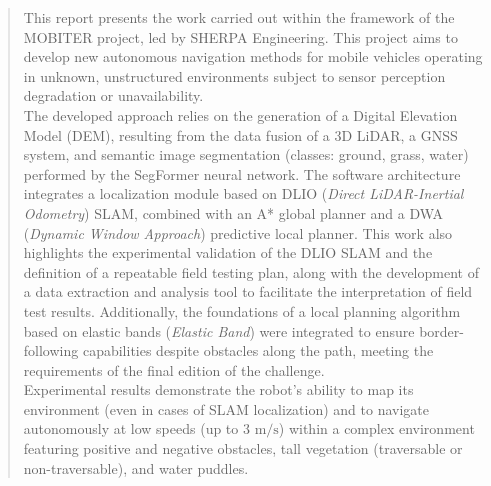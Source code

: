 \documentclass{CoursENSAM}
\begin{document}
\renewcommand{\abstractname}{Abstract}
\begin{abstract}
This report presents the work carried out within the framework of the MOBITER project, led by SHERPA Engineering. This project aims to develop new autonomous navigation methods for mobile vehicles operating in unknown, unstructured environments subject to sensor perception degradation or unavailability.\\
\indent The developed approach relies on the generation of a Digital Elevation Model (DEM), resulting from the data fusion of a 3D LiDAR, a GNSS system, and semantic image segmentation (classes: ground, grass, water) performed by the SegFormer neural network. The software architecture integrates a localization module based on DLIO (\textit{Direct LiDAR-Inertial Odometry}) SLAM, combined with an A* global planner and a DWA (\textit{Dynamic Window Approach}) predictive local planner. This work also highlights the experimental validation of the DLIO SLAM and the definition of a repeatable field testing plan, along with the development of a data extraction and analysis tool to facilitate the interpretation of field test results. Additionally, the foundations of a local planning algorithm based on elastic bands (\textit{Elastic Band}) were integrated to ensure border-following capabilities despite obstacles along the path, meeting the requirements of the final edition of the challenge.\\
\indent Experimental results demonstrate the robot's ability to map its environment (even in cases of SLAM localization) and to navigate autonomously at low speeds (up to $3\text{ m/s}$) within a complex environment featuring positive and negative obstacles, tall vegetation (traversable or non-traversable), and water puddles.
\end{abstract}
\end{document}
